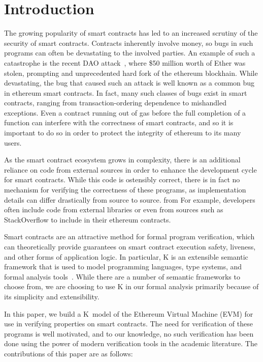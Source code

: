 \section{Introduction}
The growing popularity of smart contracts has led to an increased scrutiny of
the security of smart contracts. Contracts inherently involve money, so bugs in
such programs can often be devastating to the involved parties. An example of
such a catastrophe is the recent DAO attack~\cite{dao-attack}, where \$50
million worth of Ether was stolen, prompting and unprecedented hard fork of the
ethereum blockhain. While devastating, the bug that caused such an attack is
well known as a common bug in ethereum smart contracts. In fact, many such
classes of bugs exist in smart contracts, ranging from transaction-ordering
dependence to mishandled exceptions. Even a contract running out of gas before
the full completion of a function can interfere with the correctness of smart
contracts, and so it is important to do so in order to protect the integrity of
ethereum to its many users.

As the smart contract ecosystem grows in complexity, there is an additional
reliance on code from external sources in order to enhance the development cycle
for smart contracts. While this code is ostensibly correct, there is in fact no
mechanism for verifying the correctness of these programs, as implementation
details can differ drastically from source to source. from For example,
developers often include code from external libraries or even from sources such as
StackOverflow to include in their ethereum contracts.

Smart contracts are an attractive method for formal program verification, which
can theoretically provide guarantees on smart contract execution safety,
liveness, and other forms of application logic. In particular, K is an
extensible semantic framework that is used to model programming languages, type
systems, and formal analysis tools~\cite{rosu-serbanuta-2010-jlap}. While there
are a number of semantic frameworks to choose from, we are choosing to use K in
our formal analysis primarily because of its simplicity and extensibility.

In this paper, we build a K~model of the Ethereum Virtual Machine (EVM) for use
in verifying properties on smart contracts. The need for verification of these
programs is well motivated, and to our knowledge, no such verification has been
done using the power of modern verification tools in the academic literature.
The contributions of this paper are as follows:

